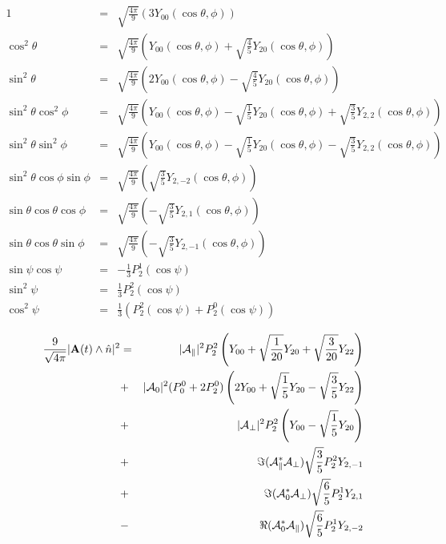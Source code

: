 \documentclass[a4paper,9pt,twoside]{article}
\begin{document}
\begin{eqnarray}
  1                       &=& \sqrt{ \frac{4\pi}{9} } \left( 3 Y_{00}(\cos\theta,\phi) \right) \\
  \cos^2\theta            &=& \sqrt{ \frac{4\pi}{9} } \left( Y_{00}(\cos\theta,\phi) + \sqrt{\frac{4}{5}}Y_{20}(\cos\theta,\phi)\right)\\
  \sin^2\theta            &=& \sqrt{ \frac{4\pi}{9} } \left( 2Y_{00}(\cos\theta,\phi) - \sqrt{\frac{4}{5}}Y_{20}(\cos\theta,\phi)\right)\\
  \sin^2\theta \cos^2\phi &=& \sqrt{ \frac{4\pi}{9} } \left( Y_{00}(\cos\theta,\phi) - \sqrt{\frac{1}{5} }Y_{20}(\cos\theta,\phi) +\sqrt{\frac{3}{5}} Y_{2,2}(\cos\theta,\phi)\right) \\
  \sin^2\theta \sin^2\phi &=& \sqrt{ \frac{4\pi}{9} } \left( Y_{00}(\cos\theta,\phi) - \sqrt{\frac{1}{5} }Y_{20}(\cos\theta,\phi) -\sqrt{\frac{3}{5}} Y_{2,2}(\cos\theta,\phi)\right) \\
  \sin^2\theta\cos\phi\sin\phi &=& \sqrt{ \frac{4\pi}{9}} \left(\sqrt{\frac{3}{5}} Y_{2,-2}(\cos\theta,\phi) \right) \\
  \sin\theta\cos\theta\cos\phi &=& \sqrt{ \frac{4\pi}{9}}\left( -\sqrt{\frac{3}{5}}Y_{2,1}(\cos\theta,\phi)\right) \\ 
  \sin\theta\cos\theta\sin\phi &=& \sqrt{ \frac{4\pi}{9}}\left( -\sqrt{\frac{3}{5}}Y_{2,-1}(\cos\theta,\phi) \right) \\
  \sin\psi\cos\psi &=& -\frac{1}{3} P_2^1(\cos\psi) \\
  \sin^2 \psi      &=&  \frac{1}{3} P_2^2(\cos\psi) \\
  \cos^2 \psi      &=&  \frac{1}{3} \left( P_2^2(\cos\psi)+P_2^0(\cos\psi) \right)
\end{eqnarray}

\begin{eqnarray}
\frac{9 }{\sqrt{4\pi}} |{ \bf A}(t) \wedge \hat{n}|^2 
                              &=&|{\cal A}_\parallel|^2 P_2^2 \left( Y_{00}+\sqrt{\frac{1}{20}}Y_{20}+\sqrt{\frac{3}{20}}Y_{22}  \right)  \\
                              &+&|{\cal A}_0|^2  (P_0^0+2P_2^0 ) \left( 2 Y_{00}+\sqrt{\frac{1}{5}}Y_{20}-\sqrt{\frac{3}{5}}Y_{22} \right) \\
                              &+&|{\cal A}_\perp|^2  P_2^2 \left( Y_{00} - \sqrt{\frac{1}{5}}Y_{20}\right)\\
                              &+&\Im({\cal A}_\parallel^*{\cal A}_\perp) \sqrt{\frac{3}{5}}P_2^2 Y_{2,-1}  \\
                              &+&\Im({\cal A}_0^* {\cal A}_\perp )       \sqrt{\frac{6}{5}}P_2^1Y_{2,1} \\
                              &-&\Re({\cal A}_0^*{\cal A}_\parallel  )   \sqrt{\frac{6}{5}}P_2^1 Y_{2,-2} 
\end{eqnarray}
\end{document}
